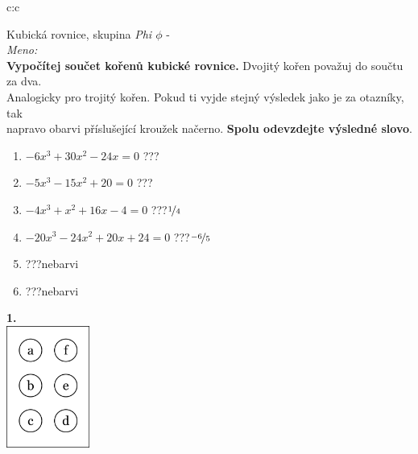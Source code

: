 \documentclass[10pt]{report}
\begin{document}
\begin{tabular}{c:c}
\begin{minipage}[c][99mm][t]{0.49\linewidth}
\begin{center}
\vspace{7mm}
{\huge Kubická rovnice, skupina \textit{Phi $\phi$} -}\\[4.5mm]
\textit{Meno:}\phantom{xxxxxxxxxxxxxxxxxxxxxxxxxxxxxxxxxxxxxxxxxxxxxxxxxxxxxxxxxxxxxxxxx}\\[3.5mm]
\textbf{Vypočítej součet kořenů kubické rovnice.} Dvojitý kořen považuj do součtu za dva.\\Analogicky pro trojitý kořen. Pokud ti vyjde stejný výsledek jako je za otazníky, tak\\napravo obarvi příslušející kroužek načerno. \textbf{Spolu odevzdejte výsledné slovo}.\\[3mm]
\begin{minipage}{0.77\linewidth}
\begin{center}
\begin{varwidth}{\textwidth}
\begin{enumerate}
\large
\item $-6x^3+30x^2-24x=0$\quad \dotfill\; ???\;\dotfill {}
\item $-5x^3-15x^2+20=0$\quad \dotfill\; ???\;\dotfill {}
\item $-4x^3+x^2+16x-4=0$\quad \dotfill\; ???\;\dotfill \quad $\nicefrac{1}{4}$
\item $-20x^3-24x^2+20x+24=0$\quad \dotfill\; ???\;\dotfill \quad $\nicefrac{-6}{5}$
\item \quad \dotfill\; ???\;\dotfill \quad nebarvi
\item \quad \dotfill\; ???\;\dotfill \quad nebarvi
\end{enumerate}
\end{varwidth}
\end{center}
\end{minipage}
\begin{minipage}{0.20\linewidth}
\begin{center}
{\Huge\bfseries 1.} \\[2mm]
\includegraphics[height=40mm]{../images/braille.png}

\end{center}
\end{minipage}
\end{center}
\end{minipage}
\end{tabular}
\end{document}
